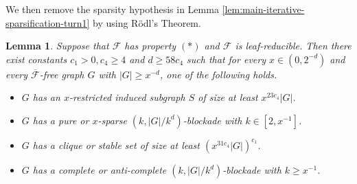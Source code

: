 \documentclass[a4paper,11pt]{article}
\newtheorem{lemma}[theorem]{Lemma}
\begin{document}
    We then remove the sparsity hypothesis in Lemma \ref{lem:main-iterative-sparsification-turn1} by using R\"odl's Theorem.

    \begin{lemma}\label{main-rodl-turn1}
        Suppose that $\mathcal{F}$ has property $(*)$ and $\mathcal{F}$ is leaf-reducible. Then
        there exist constants $c_1>0,c_4\geq 4$ and $d\geq 58c_4$ such that for every $x\in (0,2^{-d})$ and every $\overline{\mathcal{F}}$-free graph $G$ with $|G|\geq x^{-d}$, one of the following holds. 
        \begin{itemize}
            \item[$(1)$] $G$ has an $x$-restricted induced subgraph $S$ of size at least $x^{23c_4}|G|$. 
            
            \item[$(2)$] $G$ has a pure or $x$-sparse $(k,|G|/k^d)$-blockade with $k\in[2,x^{-1}]$.
            
            \item[$(3)$] $G$ has a clique or stable set of size at least $(x^{31c_4}|G|)^{c_1}$.
            
            \item[$(4)$] $G$ has a complete or anti-complete $(k,|G|/k^d)$-blockade with $k\geq x^{-1}$.  

        \end{itemize}
    \end{lemma}
    
\end{document}
